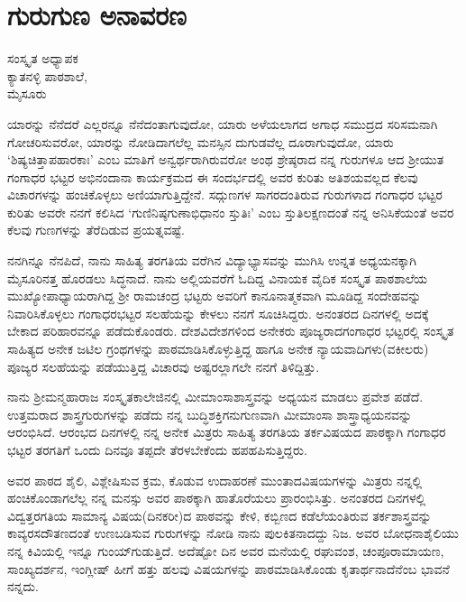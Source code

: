 {\fontsize{14}{16}\selectfont
\chapter{ಗುರುಗುಣ ಅನಾವರಣ}

\begin{center}
\smallskip
ಸಂಸ್ಕೃತ ಅಧ್ಯಾಪಕ\\
ಕ್ಯಾತನಳ್ಳಿ ಪಾಠಶಾಲೆ,\\
ಮೈಸೂರು
\addrule
\end{center}
ಯಾರನ್ನು ನೆನೆದರೆ ಎಲ್ಲರನ್ನೂ ನೆನೆದಂತಾಗುವುದೋ, ಯಾರು ಅಳೆಯಲಾಗದ ಅಗಾಧ ಸಮುದ್ರದ ಸರಿಸಮನಾಗಿ ಗೋಚರಿಸುವರೋ, ಯಾರನ್ನು ನೋಡಿದಾಗಲೆಲ್ಲ ಮನಸ್ಸಿನ ದುಗುಡವೆಲ್ಲ ದೂರಾಗುವುದೋ, ಯಾರು ‘ಶಿಷ್ಯಚಿತ್ತಾಪಹಾರಕಾಃ’ ಎಂಬ ಮಾತಿಗೆ ಅನ್ವರ್ಥರಾಗಿರುವರೋ ಅಂಥ ಶ್ರೇಷ್ಠರಾದ ನನ್ನ ಗುರುಗಳೂ ಆದ ಶ್ರೀಯುತ ಗಂಗಾಧರ ಭಟ್ಟರ ಅಭಿನಂದಾನಾ ಕಾರ್ಯಕ್ರಮದ ಈ ಸಂದರ್ಭದಲ್ಲಿ ಅವರ ಕುರಿತು ಅತಿಶಯವಲ್ಲದ ಕೆಲವು ವಿಚಾರಗಳನ್ನು ಹಂಚಿಕೊಳ್ಳಲು ಅಣಿಯಾಗುತ್ತಿದ್ದೇನೆ. ಸದ್ಗುಣಗಳ ಸಾಗರದಂತಿರುವ  ಗುರುಗಳಾದ ಗಂಗಾಧರ ಭಟ್ಟರ ಕುರಿತು ಅವರೇ ನನಗೆ ಕಲಿಸಿದ ‘ಗುಣಿನಿಷ್ಠಗುಣಾಭಿಧಾನಂ ಸ್ತುತಿಃ’ ಎಂಬ ಸ್ತುತಿಲಕ್ಷಣದಂತೆ ನನ್ನ ಅನಿಸಿಕೆಯಂತೆ ಅವರ ಕೆಲವು ಗುಣಗಳನ್ನು ತೆರೆದಿಡುವ ಪ್ರಯತ್ನವಷ್ಟೆ.

ನನಗಿನ್ನೂ ನೆನಪಿದೆ, ನಾನು ಸಾಹಿತ್ಯ ತರಗತಿಯ ವರೆಗಿನ ವಿದ್ಯಾಭ್ಯಾಸವನ್ನು ಮುಗಿಸಿ ಉನ್ನತ ಅಧ್ಯಯನಕ್ಕಾಗಿ ಮೈಸೂರಿನತ್ತ ಹೊರಡಲು ಸಿದ್ಧನಾದೆ. ನಾನು ಅಲ್ಲಿಯವರೆಗೆ ಓದಿದ್ದ ವಿನಾಯಕ ವೈದಿಕ ಸಂಸ್ಕೃತ ಪಾಠಶಾಲೆಯ ಮುಖ್ಯೋಪಾಧ್ಯಾಯರಾಗಿದ್ದ ಶ್ರೀ ರಾಮಚಂದ್ರ ಭಟ್ಟರು ಅವರಿಗೆ ಕಾನೂನಾತ್ಮಕವಾಗಿ ಮೂಡಿದ್ದ ಸಂದೇಹವನ್ನು ನಿವಾರಿಸಿಕೊಳ್ಳಲು ಗಂಗಾಧರಭಟ್ಟರ ಸಲಹೆಯನ್ನು ಕೇಳಲು ನನಗೆ ಸೂಚಿಸಿದ್ದರು. ಅನಂತರದ ದಿನಗಳಲ್ಲಿ ಅದಕ್ಕೆ ಬೇಕಾದ ಪರಿಹಾರವನ್ನೂ  ಪಡೆದುಕೊಂಡರು. ದೇಶವಿದೇಶಗಳಿಂದ ಅನೇಕರು ಪೂಜ್ಯರಾದಗಂಗಾಧರ ಭಟ್ಟರಲ್ಲಿ ಸಂಸ್ಕೃತ ಸಾಹಿತ್ಯದ ಅನೇಕ ಜಟಿಲ ಗ್ರಂಥಗಳನ್ನು ಪಾಠಮಾಡಿಸಿಕೊಳ್ಳುತ್ತಿದ್ದ ಹಾಗೂ ಅನೇಕ ನ್ಯಾಯವಾದಿಗಳು(ವಕೀಲರು) ಪೂಜ್ಯರ ಸಲಹೆಯನ್ನು ಪಡೆಯುತ್ತಿದ್ದ ವಿಚಾರವು ಅಷ್ಟರಲ್ಲಾಗಲೇ ನನಗೆ ತಿಳಿದ್ದಿತ್ತು. 

ನಾನು ಶ್ರೀಮನ್ಮಹಾರಾಜ ಸಂಸ್ಕೃತಕಾಲೇಜಿನಲ್ಲಿ ಮೀಮಾಂಸಾಶಾಸ್ತ್ರವನ್ನು ಅಧ್ಯಯನ ಮಾಡಲು ಪ್ರವೇಶ ಪಡೆದೆ. ಉತ್ತಮರಾದ ಶಾಸ್ತ್ರಗುರುಗಳನ್ನು ಪಡೆದು ನನ್ನ ಬುದ್ಧಿಶಕ್ತಿಗನುಗುಣವಾಗಿ ಮೀಮಾಂಸಾ ಶಾಸ್ತ್ರಾಧ್ಯಯನವನ್ನು ಆರಂಭಿಸಿದೆ. ಆರಂಭದ ದಿನಗಳಲ್ಲಿ ನನ್ನ ಅನೇಕ ಮಿತ್ರರು ಸಾಹಿತ್ಯ ತರಗತಿಯ ತರ್ಕವಿಷಯದ ಪಾಠಕ್ಕಾಗಿ ಗಂಗಾಧರ ಭಟ್ಟರ ತರಗತಿಗೆ ಒಂದು ದಿನವೂ ತಪ್ಪದೇ  ತೆರಳಬೇಕೆಂದು ಹಪಹಪಿಸುತ್ತಿದ್ದರು.
\vskip 2pt

ಅವರ ಪಾಠದ ಶೈಲಿ, ವಿಶ್ಲೇಷಿಸುವ ಕ್ರಮ, ಕೊಡುವ ಉದಾಹರಣೆ ಮುಂತಾದ\break ವಿಷಯಗಳನ್ನು ಮಿತ್ರರು ನನ್ನಲ್ಲಿ ಹಂಚಿಕೊಂಡಾಗಲೆಲ್ಲ ನನ್ನ ಮನಸ್ಸು ಅವರ ಪಾಠಕ್ಕಾಗಿ ಹಾತೊರೆಯಲು ಪ್ರಾರಂಭಿಸಿತ್ತು. ಅನಂತರದ ದಿನಗಳಲ್ಲಿ ವಿದ್ವತ್ತರಗತಿಯ ಸಾಮಾನ್ಯ ವಿಷಯ(ದಿನಕರೀ)ದ ಪಾಠವನ್ನು ಕೇಳಿ, ಕಬ್ಬಿಣದ ಕಡೆಲೆಯಂತಿರುವ ತರ್ಕಶಾಸ್ತ್ರವನ್ನು ಕಾವ್ಯರಸದೌತಣದಂತೆ  ಉಣಬಡಿಸುವ ಗುರುಗಳನ್ನು ನೋಡಿ ನಾನು ಪುಲಕಿತ\-ನಾದದ್ದು ನಿಜ.  ಅವರ ಬೋಧನಾಶೈಲಿಯು ನನ್ನ ಕಿವಿಯಲ್ಲಿ ಇನ್ನೂ ಗುಂಯ್‍ಗುಡುತ್ತಿದೆ. ಅದೆಷ್ಟೋ ದಿನ ಅವರ ಮನೆಯಲ್ಲಿ ರಘುವಂಶ, ಚಂಪೂರಾಮಾಯಣ, ಸಾಂಖ್ಯ\-ದರ್ಶನ, ಇಂಗ್ಲೀಷ್ ಹೀಗೆ ಹತ್ತು ಹಲವು ವಿಷಯಗಳನ್ನು ಪಾಠಮಾಡಿಸಿಕೊಂಡು ಕೃತಾರ್ಥ\-ನಾದೆನೆಂಬ ಭಾವನೆ ನನ್ನದು.
\vskip 2pt

}

